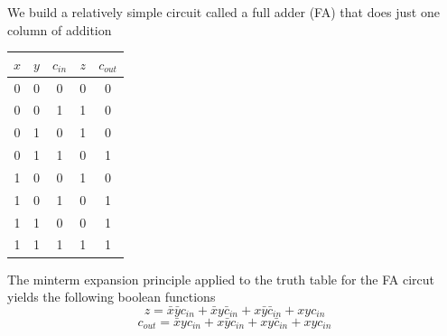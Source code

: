\documentclass[8pt,a4paper,compress]{beamer}
\begin{document}
\begin{frame}[fragile]
\pause

We build a relatively simple circuit called a full adder (FA) that does just one column of addition

\bigskip

\begin{minipage}{150pt}
\begin{center}
\end{center}
\end{minipage}%
\begin{minipage}{150pt}
\begin{center}
\begin{tabular}{ccc|cc}
$x$ & $y$ & $c_{in}$ & $z$ & $c_{out}$ \\ \hline
0 & 0 & 0 & 0 & 0 \\
0 & 0 & 1 & 1 & 0 \\
0 & 1 & 0 & 1 & 0 \\
0 & 1 & 1 & 0 & 1 \\
1 & 0 & 0 & 1 & 0 \\
1 & 0 & 1 & 0 & 1 \\
1 & 1 & 0 & 0 & 1 \\
1 & 1 & 1 & 1 & 1
\end{tabular}
\end{center}
\end{minipage}

\pause
\bigskip

The minterm expansion principle applied to the truth table for the FA circut yields the following boolean functions $$z = \bar{x}\bar{y}c_{in}+\bar{x}y\bar{c}_{in}+x\bar{y}\bar{c}_{in}+xyc_{in}$$ $$c_{out} = \bar{x}yc_{in}+x\bar{y}c_{in}+xy\bar{c}_{in}+xyc_{in}$$

\end{frame}
\end{document}
